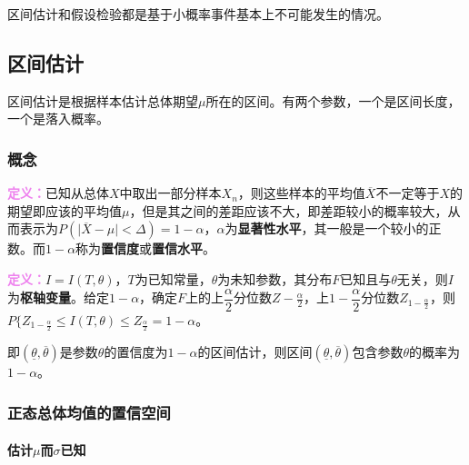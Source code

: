 \documentclass[UTF8, 12pt]{ctexart}
\begin{document}


区间估计和假设检验都是基于小概率事件基本上不可能发生的情况。

\subsection{区间估计}

区间估计是根据样本估计总体期望$\mu$所在的区间。有两个参数，一个是区间长度，一个是落入概率。

\subsubsection{概念}

\textcolor{violet}{\textbf{定义：}}已知从总体$X$中取出一部分样本$X_n$，则这些样本的平均值$\overline{X}$不一定等于$X$的期望即应该的平均值$\mu$，但是其之间的差距应该不大，即差距较小的概率较大，从而表示为$P(\vert\overline{X}-\mu\vert<\Delta)=1-\alpha$，$\alpha$为\textbf{显著性水平}，其一般是一个较小的正数。而$1-\alpha$称为\textbf{置信度}或\textbf{置信水平}。

\textcolor{violet}{\textbf{定义：}}$I=I(T,\theta)$，$T$为已知常量，$\theta$为未知参数，其分布$F$已知且与$\theta$无关，则$I$为\textbf{枢轴变量}。给定$1-\alpha$，确定$F$上的上$\dfrac{\alpha}{2}$分位数$Z-{\frac{\alpha}{2}}$，上$1-\dfrac{\alpha}{2}$分位数$Z_{1-\frac{\alpha}{2}}$，则$P\{Z_{1-\frac{\alpha}{2}}\leqslant I(T,\theta)\leqslant Z_{\frac{\alpha}{2}}=1-\alpha$。

即$(\underline{\theta},\overline{\theta})$是参数$\theta$的置信度为$1-\alpha$的区间估计，则区间$(\underline{\theta},\overline{\theta})$包含参数$\theta$的概率为$1-\alpha$。

\subsubsection{正态总体均值的置信空间}

\paragraph{\texorpdfstring{估计$\mu$而$\sigma$已知}{}} \leavevmode \medskip
\end{document}
